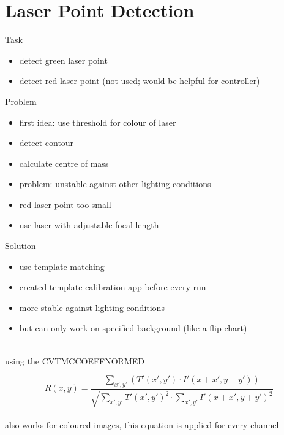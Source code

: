 \documentclass{beamer}
\begin{document}
\section{Laser Point Detection}
\frame{\tableofcontents[currentsection]}

\begin{frame}{Task}

\begin{itemize}
	\item detect green laser point
	\item detect red laser point (not used; would be helpful for controller)
\end{itemize}


\end{frame}

\begin{frame}{Problem}

\begin{itemize}
	\item first idea: use threshold for colour of laser
	\item detect contour 
	\item calculate centre of mass 
	\item problem: unstable against other lighting conditions
	\bigskip
	\item red laser point too small
	\item use laser with adjustable focal length 
\end{itemize}


\end{frame}

\begin{frame}{Solution}

\begin{itemize}
	\item use template matching
	\item created template calibration app before every run
	\item more stable against lighting conditions
	\item but can only work on specified background (like a flip-chart)
\end{itemize}
~\\
using the CV\textunderscore TM\textunderscore CCOEFF\textunderscore NORMED

\begin{equation}
R(x,y) = \frac{\sum_{x',y'} (T'(x',y') \cdot I'(x + x', y + y'))}{\sqrt{\sum_{x',y'} T'(x',y')^{2} \cdot \sum_{x',y'} I'(x + x', y + y')^{2}}}
\end{equation}
~\\
also works for coloured images, this equation is applied for every channel


\end{frame}
\end{document}
